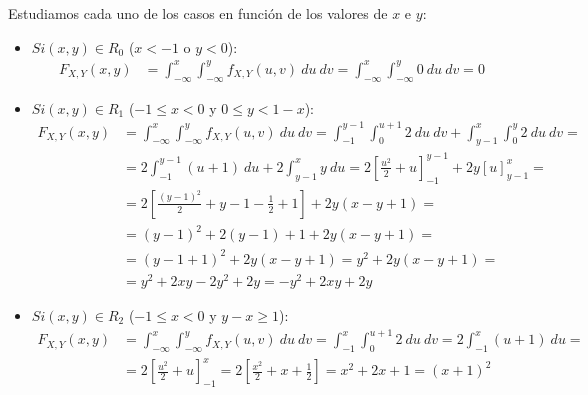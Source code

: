 \documentclass[12pt]{article}
\begin{document}
\begin{ejercicio}[5 puntos]
\begin{enumerate}
            Estudiamos cada uno de los casos en función de los valores de $x$ e $y$:
            \begin{itemize}
                \item \ul{$Si (x,y)\in R_0$} ($x<-1$ o $y<0$):
                \begin{align*}
                    F_{X,Y}(x,y) &= \int_{-\infty}^{x}\int_{-\infty}^{y} f_{X,Y}(u,v) \ du \ dv
                    = \int_{-\infty}^{x}\int_{-\infty}^{y} 0 \ du \ dv = 0
                \end{align*}

                \item \ul{$Si (x,y)\in R_1$} ($-1\leq x<0$ y $0\leq y<1-x$):
                \begin{align*}
                    F_{X,Y}(x,y) &= \int_{-\infty}^{x}\int_{-\infty}^{y} f_{X,Y}(u,v) \ du \ dv
                    = \int_{-1}^{y-1}\int_{0}^{u+1} 2 \ du \ dv + \int_{y-1}^{x}\int_{0}^{y} 2 \ du \ dv
                    =\\&= 2\int_{-1}^{y-1} (u+1) \ du + 2\int_{y-1}^{x} y \ du
                    = 2\left[\frac{u^2}{2}+u\right]_{-1}^{y-1} + 2y\left[u\right]_{y-1}^{x}
                    =\\&= 2\left[\frac{(y-1)^2}{2} + y-1-\frac{1}{2}+1\right] + 2y(x-y+1)
                    =\\&= (y-1)^2 + 2(y-1) + 1 + 2y(x-y+1)
                    =\\&= (y-1+1)^2 + 2y(x-y+1) = y^2 + 2y(x-y+1)
                    =\\&= y^2 + 2xy - 2y^2 + 2y
                    = -y^2 + 2xy + 2y
                \end{align*}

                \item \ul{$Si (x,y)\in R_2$} ($-1\leq x<0$ y $y-x\geq 1$):
                \begin{align*}
                    F_{X,Y}(x,y) &= \int_{-\infty}^{x}\int_{-\infty}^{y} f_{X,Y}(u,v) \ du \ dv
                    = \int_{-1}^{x}\int_{0}^{u+1} 2 \ du \ dv
                    = 2\int_{-1}^{x} (u+1) \ du
                    =\\&= 2\left[\frac{u^2}{2}+u\right]_{-1}^{x}
                    = 2\left[\frac{x^2}{2}+x+\frac{1}{2}\right]
                    = x^2 + 2x + 1 = (x+1)^2
                \end{align*}


\end{itemize}
\end{enumerate}
\end{ejercicio}
\end{document}
